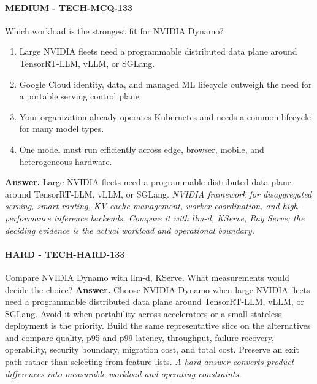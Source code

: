 \paragraph{MEDIUM - TECH-MCQ-133} Which workload is the strongest fit for NVIDIA Dynamo?
\begin{enumerate}[label=\Alph*.]
\item Large NVIDIA fleets need a programmable distributed data plane around TensorRT-LLM, vLLM, or SGLang.
\item Google Cloud identity, data, and managed ML lifecycle outweigh the need for a portable serving control plane.
\item Your organization already operates Kubernetes and needs a common lifecycle for many model types.
\item One model must run efficiently across edge, browser, mobile, and heterogeneous hardware.
\end{enumerate}
\textbf{Answer.} Large NVIDIA fleets need a programmable distributed data plane around TensorRT-LLM, vLLM, or SGLang.
\textit{NVIDIA framework for disaggregated serving, smart routing, KV-cache management, worker coordination, and high-performance inference backends. Compare it with llm-d, KServe, Ray Serve; the deciding evidence is the actual workload and operational boundary.}
\paragraph{HARD - TECH-HARD-133} Compare NVIDIA Dynamo with llm-d, KServe. What measurements would decide the choice?
\textbf{Answer.} Choose NVIDIA Dynamo when large NVIDIA fleets need a programmable distributed data plane around TensorRT-LLM, vLLM, or SGLang. Avoid it when portability across accelerators or a small stateless deployment is the priority. Build the same representative slice on the alternatives and compare quality, p95 and p99 latency, throughput, failure recovery, operability, security boundary, migration cost, and total cost. Preserve an exit path rather than selecting from feature lists.
\textit{A hard answer converts product differences into measurable workload and operating constraints.}

